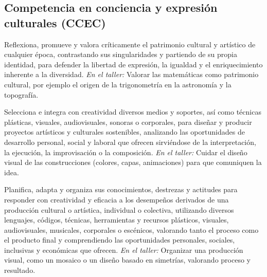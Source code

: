 \documentclass[11pt,a4paper]{article}
\begin{document}
\subsection*{Competencia en conciencia y expresión culturales (CCEC)}
\begin{description}[leftmargin=0pt, style=nextline]
  \item[\color{acento}CCEC1] Reflexiona, promueve y valora críticamente el patrimonio cultural y artístico de cualquier época, contrastando sus singularidades y partiendo de su propia identidad, para defender la libertad de expresión, la igualdad y el enriquecimiento inherente a la diversidad.\newline
    {\color{gris}\textit{En el taller:} Valorar las matemáticas como patrimonio cultural, por ejemplo el origen de la trigonometría en la astronomía y la topografía.}
  \item[\color{acento}CCEC4.1] Selecciona e integra con creatividad diversos medios y soportes, así como técnicas plásticas, visuales, audiovisuales, sonoras o corporales, para diseñar y producir proyectos artísticos y culturales sostenibles, analizando las oportunidades de desarrollo personal, social y laboral que ofrecen sirviéndose de la interpretación, la ejecución, la improvisación o la composición.\newline
    {\color{gris}\textit{En el taller:} Cuidar el diseño visual de las construcciones (colores, capas, animaciones) para que comuniquen la idea.}
  \item[\color{acento}CCEC4.2] Planifica, adapta y organiza sus conocimientos, destrezas y actitudes para responder con creatividad y eficacia a los desempeños derivados de una producción cultural o artística, individual o colectiva, utilizando diversos lenguajes, códigos, técnicas, herramientas y recursos plásticos, visuales, audiovisuales, musicales, corporales o escénicos, valorando tanto el proceso como el producto final y comprendiendo las oportunidades personales, sociales, inclusivas y económicas que ofrecen.\newline
    {\color{gris}\textit{En el taller:} Organizar una producción visual, como un mosaico o un diseño basado en simetrías, valorando proceso y resultado.}
\end{description}
\end{document}
